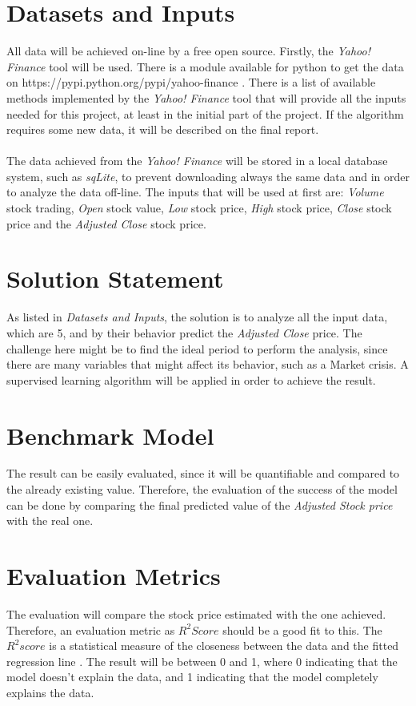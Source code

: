\documentclass[a4paper, 11pt]{article}
\begin{document}
\section*{Datasets and Inputs}
All data will be achieved on-line by a free open source. Firstly, the \emph{Yahoo! Finance} tool will be used. There is a module available for python to get the data on https://pypi.python.org/pypi/yahoo-finance .
There is a list of available methods implemented by the \emph{Yahoo! Finance} tool that will provide all the inputs needed for this project, at least in the initial part of the project. If the algorithm requires some
new data, it will be described on the final report.\\
\newline 
\\
The data achieved from the \emph{Yahoo! Finance} will be stored in a local database system, such as \emph{sqLite}, to prevent downloading always the same data and in order to analyze the data off-line.
The inputs that will be used at first are: \emph{Volume} stock trading, \emph{Open} stock value, \emph{Low} stock price, \emph{High} stock price, \emph{Close} stock price and the \emph{Adjusted Close} stock price.\\

\section*{Solution Statement}
As listed in \emph{Datasets and Inputs}, the solution is to analyze all the input data, which are 5, and by their behavior predict the  \emph{Adjusted Close} price.
The challenge here might be to find the ideal period to perform the analysis, since there are many variables that might affect its behavior, such as a Market crisis.
A supervised learning algorithm will be applied in order to achieve the result.

\section*{Benchmark Model}
The result can be easily evaluated, since it will be quantifiable and compared to the already existing value. Therefore, the evaluation of the success of the model can be done by comparing the final
predicted value of the \emph{Adjusted Stock price} with the real one.\\

\section*{Evaluation Metrics}
The evaluation will compare the stock price estimated with the one achieved. Therefore, an evaluation metric as $R^2 Score$ should be a good fit to this. 
The $R^2 score$ is a statistical measure of the closeness between the data and the fitted regression line \cite{R2}. The result will be between 0 and 1, where 0 indicating that the model doesn't explain 
the data, and 1 indicating that the model completely explains the data.\\
\end{document}
